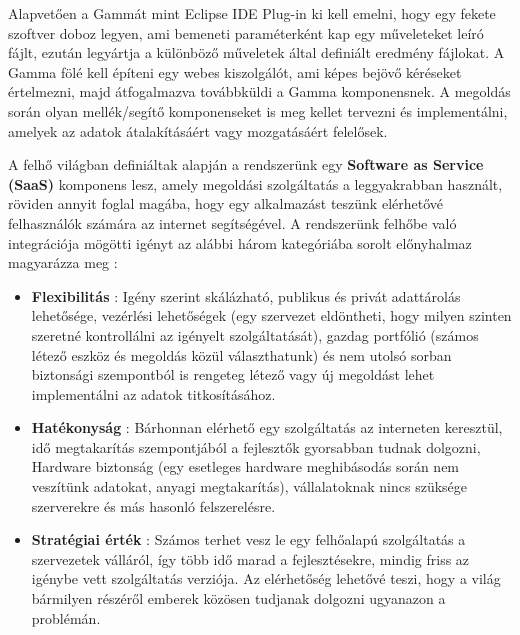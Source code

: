 Alapvetően a Gammát mint Eclipse IDE Plug-in ki kell emelni, hogy egy fekete szoftver doboz legyen, ami bemeneti paraméterként kap egy műveleteket leíró fájlt, ezután legyártja a különböző műveletek által definiált eredmény fájlokat. A Gamma fölé kell építeni egy webes kiszolgálót, ami képes bejövő kéréseket értelmezni, majd átfogalmazva továbbküldi a Gamma komponensnek. A megoldás során olyan mellék/segítő komponenseket is meg kellet tervezni és implementálni, amelyek az adatok átalakításáért vagy mozgatásáért felelősek.


A felhő világban definiáltak alapján a rendszerünk egy \textbf{Software as Service (SaaS)} komponens lesz, amely megoldási szolgáltatás a leggyakrabban használt, röviden annyit foglal magába, hogy egy alkalmazást teszünk elérhetővé felhasználók számára az internet segítségével.
A rendszerünk felhőbe való integrációja mögötti igényt az alábbi három kategóriába sorolt előnyhalmaz magyarázza meg \cite{top10,ibm}:

 \begin{itemize}
	\item \textbf{Flexibilitás} : Igény szerint skálázható, publikus és privát adattárolás lehetősége, vezérlési lehetőségek (egy szervezet eldöntheti, hogy milyen szinten szeretné kontrollálni az igényelt szolgáltatását), gazdag portfólió (számos létező eszköz és megoldás közül választhatunk) és nem utolsó sorban biztonsági szempontból is rengeteg létező vagy új megoldást lehet implementálni az adatok titkosításához.
	\item \textbf{Hatékonyság} : Bárhonnan elérhető egy szolgáltatás az interneten keresztül, idő megtakarítás szempontjából a fejlesztők gyorsabban tudnak dolgozni, Hardware biztonság (egy esetleges hardware meghibásodás során nem veszítünk adatokat, anyagi megtakarítás), vállalatoknak nincs szüksége szerverekre és más hasonló felszerelésre.
	\item \textbf{Stratégiai érték} : Számos terhet vesz le egy felhőalapú szolgáltatás a szervezetek válláról, így több idő marad a fejlesztésekre, mindig friss az igénybe vett szolgáltatás verziója. Az elérhetőség lehetővé teszi, hogy a világ bármilyen részéről emberek közösen tudjanak dolgozni ugyanazon a problémán.
\end{itemize}

